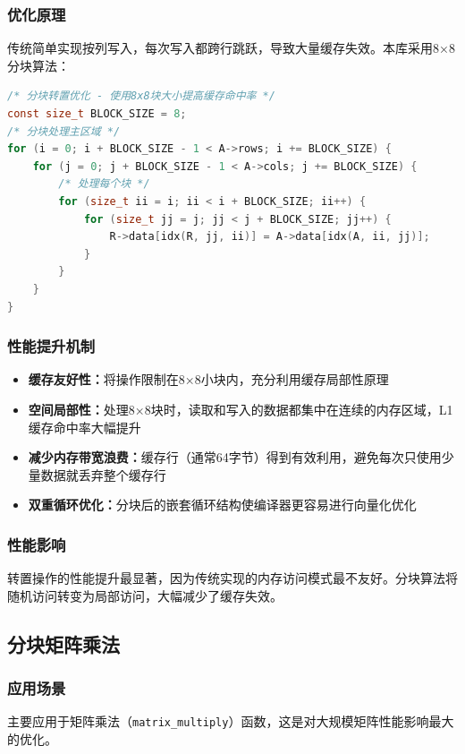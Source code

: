 \documentclass[12pt,a4paper]{article}
\begin{document}
\subsubsection{优化原理}
传统简单实现按列写入，每次写入都跨行跳跃，导致大量缓存失效。本库采用8×8分块算法：

\begin{lstlisting}[language=c]
/* 分块转置优化 - 使用8x8块大小提高缓存命中率 */
const size_t BLOCK_SIZE = 8;
/* 分块处理主区域 */
for (i = 0; i + BLOCK_SIZE - 1 < A->rows; i += BLOCK_SIZE) {
    for (j = 0; j + BLOCK_SIZE - 1 < A->cols; j += BLOCK_SIZE) {
        /* 处理每个块 */
        for (size_t ii = i; ii < i + BLOCK_SIZE; ii++) {
            for (size_t jj = j; jj < j + BLOCK_SIZE; jj++) {
                R->data[idx(R, jj, ii)] = A->data[idx(A, ii, jj)];
            }
        }
    }
}
\end{lstlisting}

\subsubsection{性能提升机制}
\begin{itemize}
    \item \textbf{缓存友好性：}将操作限制在8×8小块内，充分利用缓存局部性原理
    \item \textbf{空间局部性：}处理8×8块时，读取和写入的数据都集中在连续的内存区域，L1缓存命中率大幅提升
    \item \textbf{减少内存带宽浪费：}缓存行（通常64字节）得到有效利用，避免每次只使用少量数据就丢弃整个缓存行
    \item \textbf{双重循环优化：}分块后的嵌套循环结构使编译器更容易进行向量化优化
\end{itemize}

\subsubsection{性能影响}
转置操作的性能提升最显著，因为传统实现的内存访问模式最不友好。分块算法将随机访问转变为局部访问，大幅减少了缓存失效。

\subsection{分块矩阵乘法}

\subsubsection{应用场景}
主要应用于矩阵乘法（\texttt{matrix\_multiply}）函数，这是对大规模矩阵性能影响最大的优化。
\end{document}

